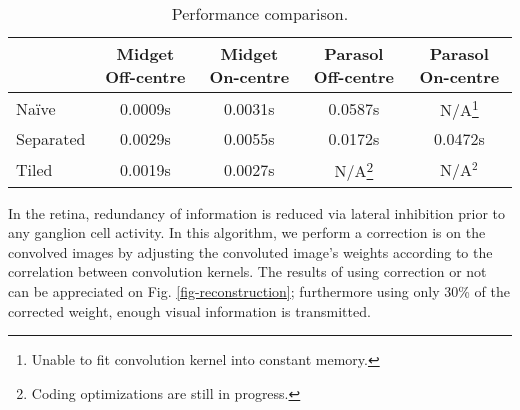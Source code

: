 \begin{table}[hbt]
  \begin{center}
    \caption{Performance comparison.}
    \bgroup
    \def\arraystretch{1.2}
    \begin{tabular}{l c c c c}
      &
      \begin{minipage}{1.2cm}Midget Off-centre\vspace*{0.05cm}\end{minipage} & 
      \begin{minipage}{1.2cm}Midget On-centre\vspace*{0.05cm}\end{minipage}& 
      \begin{minipage}{1.2cm}Parasol Off-centre\vspace*{0.05cm}\end{minipage}& 
      \begin{minipage}{1.2cm}Parasol On-centre\vspace*{0.05cm}\end{minipage}\\
      \hline 
      Naïve     & 0.0009s & 0.0031s & 0.0587s & N/A\footnote{Unable to fit convolution kernel into constant memory.} \\ 
      Separated & 0.0029s & 0.0055s & 0.0172s & 0.0472s \\ 
      Tiled     & 0.0019s & 0.0027s & N/A\footnote{ Coding optimizations are still in progress.} & N/A$^2$ \\ 
       
    \end{tabular} 
    \egroup
  \end{center}
\end{table}
\vspace*{-10pt}

In the retina, redundancy of information is reduced via lateral inhibition 
prior to any ganglion cell activity. In this algorithm, we perform a correction 
is on the convolved images by adjusting the convoluted image's weights 
according to the correlation between convolution kernels. The results of using
correction or not can be appreciated on Fig. \ref{fig-reconstruction}; 
furthermore using only 30\% of the corrected weight, enough visual information 
is transmitted\cite{basab-model}.

